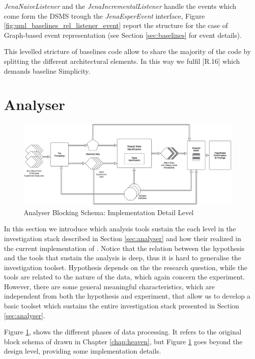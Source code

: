 \textit{JenaNaiveListener} and the  \textit{JenaIncrementalListener} handle the events which come form the DSMS trough the \textit{JenaEsperEvent} interface, Figure \ref{fig:uml_baselines_rel_listener_event} report  the structure for the case of Graph-based event representation (see Section \ref{sec:baselines} for event details). 

This levelled stricture of  baselines code allow to share the majority of the code by splitting the different architectural elements. In this way we fulfil [R.16] which demands baseline Simplicity.


\section{Analyser}\label{sec:analyser-impl}

\begin{figure}[tbh]
  \centering
	\includegraphics[width=\linewidth]{images/analyser-block-schema-impl}
	\caption{Analyser Blocking Schema: Implementation Detail Level} 
  	\label{fig:analyser-block-schema-impl}
\end{figure}

\noindent In this section we introduce which analysis tools sustain the each level in the investigation stack described in Section \ref{sec:analyser} and how their realized in the current implementation of \name. Notice that the relation between the hypothesis and the tools that sustain the analysis is deep, thus it is hard to generalise the investigation toolset. Hypothesis depends on the the research question, while the tools are related to the nature of the data, which again concern the experiment.  However, there are some general meaningful characteristics, which are independent from both the hypothesis and experiment, that allow us to develop a basic toolset which sustains the entire investigation stack presented in Section \ref{sec:analyser}.

Figure \ref{fig:analyser-block-schema-impl}, shows the different phases of data processing. It refers to the original block schema of drawn in Chapter \ref{chap:heaven}, but Figure \ref{fig:analyser-block-schema-impl} goes beyond the design level, providing some implementation details. 

